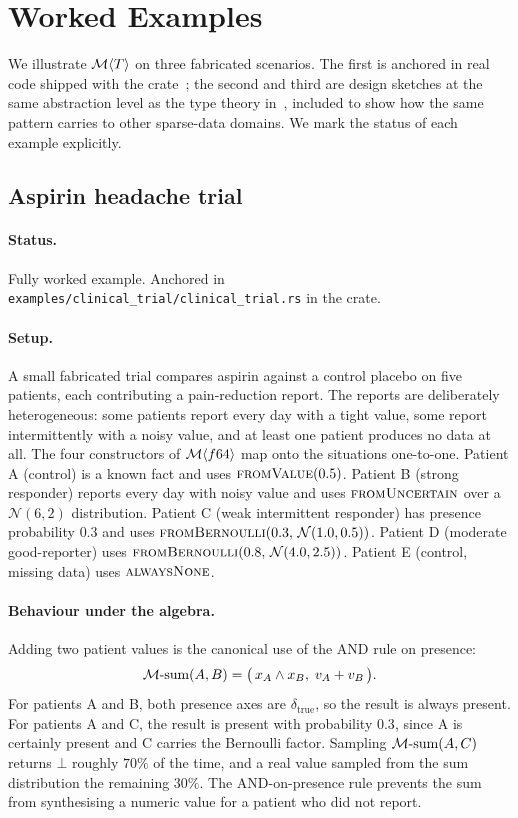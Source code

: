 \section{Worked Examples}
\label{sec:examples}

We illustrate $\mathcal{M}\langle T \rangle$ on three fabricated scenarios. The
first is anchored in real code shipped with the
crate~\cite{hansen_deepcausality}; the second and third are design
sketches at the same abstraction level as the type theory
in~, included to show how the same pattern carries to
other sparse-data domains. We mark the status of each example explicitly.

\subsection{Aspirin headache trial}
\label{sec:examples:trial}

\paragraph{Status.} Fully worked example. Anchored in
\texttt{examples/clinical\_trial/clinical\_trial.rs} in the crate.

\paragraph{Setup.} A small fabricated trial compares aspirin against a
control placebo on five patients, each contributing a pain-reduction
report. The reports are deliberately heterogeneous: some patients report
every day with a tight value, some report intermittently with a noisy
value, and at least one patient produces no data at all. The four
constructors of $\mathcal{M}\langle f64 \rangle$ map onto the situations
one-to-one. Patient A (control) is a known fact and uses
$\textsc{fromValue}(0.5)$. Patient B (strong responder) reports every day
with noisy value and uses $\textsc{fromUncertain}$ over a $\mathcal{N}(6,2)$
distribution. Patient C (weak intermittent responder) has presence
probability $0.3$ and uses $\textsc{fromBernoulli}(0.3,\,\mathcal{N}(1.0,
0.5))$. Patient D (moderate good-reporter) uses
$\textsc{fromBernoulli}(0.8,\,\mathcal{N}(4.0, 2.5))$. Patient E (control,
missing data) uses $\textsc{alwaysNone}$.

\paragraph{Behaviour under the algebra.} Adding two patient values is the
canonical use of the AND rule on presence:
$$
\mathcal{M}\text{-sum}(A, B) = \bigl(\,x_A \wedge x_B,\; v_A + v_B\,\bigr).
$$
For patients A and B, both presence axes are $\delta_{\text{true}}$, so
the result is always present. For patients A and C, the result is present
with probability $0.3$, since A is certainly present and C carries the
Bernoulli factor. Sampling $\mathcal{M}\text{-sum}(A, C)$ returns $\bot$ roughly
$70\%$ of the time, and a real value sampled from the sum distribution the
remaining $30\%$. The AND-on-presence rule prevents the sum from
synthesising a numeric value for a patient who did not report.

